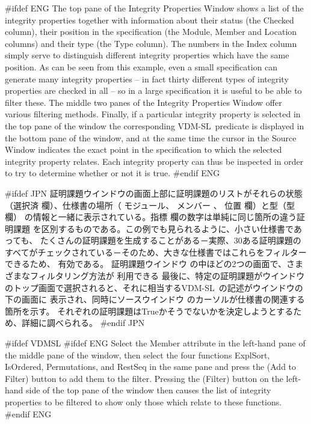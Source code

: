 \documentclass[\pformat,12pt]{article}
\newcommand{\vdmslpp}{VDM-SL}
\newcommand{\vdmslpp}{VDM++}
\newcommand{\guicmd}[1]{{\sf #1}}
\newcommand{\guicmd}[1]{{\gt #1}}
\begin{document}
#ifdef ENG
The top pane of the \guicmd{Integrity Properties Window} shows a list
of the integrity properties together with information about their
status (the \guicmd{Checked} column), their position in the specification (the
\guicmd{Module}, \guicmd{Member} and \guicmd{Location} columns) and
their type (the \guicmd{Type} column). The numbers in the
\guicmd{Index} column simply serve to distinguish different integrity
properties which have the same position. As can be seen from this
example, even a small specification can generate many integrity
properties -- in fact thirty different types of integrity properties
are checked in all -- so in a large specification it is useful to be
able to filter these. The middle two panes of the \guicmd{Integrity
  Properties Window} offer various filtering
methods. Finally, if a particular integrity 
property is selected in the top pane of the window the corresponding
\vdmslpp\ predicate is displayed in the bottom pane of the window, and
at the same time the cursor in the \guicmd{Source Window} indicates
the exact point in the specification to which the selected integrity
property relates. Each integrity property can thus be inspected in
order to try to determine whether or not it is true.
#endif ENG

#ifdef JPN
\guicmd{証明課題ウインドウ}の画面上部に証明課題のリストがそれらの状態
（\guicmd{選択済} 欄）、仕様書の場所（
\guicmd{モジュール}、 \guicmd{メンバー} 、 \guicmd{位置} 欄）と型（\guicmd{型}欄）
の情報と一緒に表示されている。\guicmd{指標} 欄の数字は単純に同じ箇所の違う証明課題
を区別するものである。この例でも見られるように、小さい仕様書であっても、
たくさんの証明課題を生成することがある－実際、30ある証明課題の
すべてがチェックされている－そのため、大きな仕様書ではこれらをフィルターできるため、
有効である。
\guicmd{証明課題ウインドウ} の中ほどの2つの画面で、さまざまなフィルタリング方法が
利用できる
最後に、特定の証明課題がウインドウ
のトップ画面で選択されると、それに相当する\vdmslpp\ の記述がウインドウの下の画面に
表示され、同時に\guicmd{ソースウインドウ} のカーソルが仕様書の関連する箇所を示す。
それぞれの証明課題はTrueかそうでないかを決定しようとするため、詳細に調べられる。
#endif JPN

#ifdef VDMSL
#ifdef ENG
Select the \guicmd{Member} attribute in the left-hand pane of the
middle pane of the window, then select the four functions
\guicmd{ExplSort}, \guicmd{IsOrdered}, \guicmd{Permutations}, and
\guicmd{RestSeq} in the same pane and press the
(\guicmd{Add to Filter}) button to add them to the filter. Pressing the 
(\guicmd{Filter}) button on the left-hand side of the top pane of
the window then causes the list of integrity properties to be filtered
to show only those which relate to these functions.
#endif ENG
\end{document}
